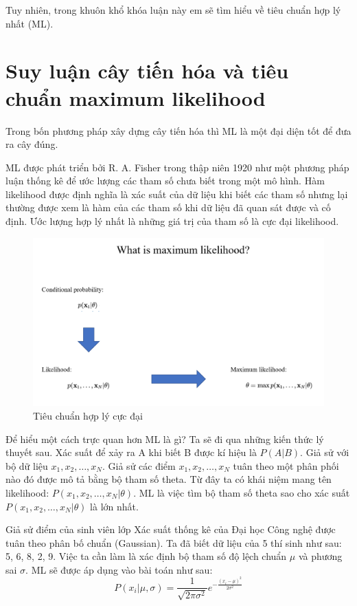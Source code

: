 \documentclass[12pt]{report}
\begin{document}
Tuy nhiên, trong khuôn khổ khóa luận này em sẽ tìm hiểu về tiêu chuẩn hợp lý nhất (ML).

\section{Suy luận cây tiến hóa và tiêu chuẩn maximum likelihood}
Trong bốn phương pháp xây dựng cây tiến hóa thì ML là một đại diện tốt để đưa ra cây đúng.

ML \cite{cia-13} được phát triển  bởi R. A. Fisher trong thập niên 1920 như một phương pháp luận thống kê để ước lượng các tham số chưa biết trong một mô hình. Hàm likelihood được định nghĩa là xác suất của dữ liệu khi biết các tham số nhưng lại thường được xem là hàm của các tham số khi dữ liệu đã quan sát được và cố định. Ước lượng hợp lý nhất là những giá trị của tham số là cực đại likelihood. 

\begin{figure}[h]
	\centering
	\includegraphics[scale=0.5]{Image/2.1.png}
	\caption{Tiêu chuẩn hợp lý cực đại}
	\label{fig:image2.1}
\end{figure}

Để hiểu một cách trực quan hơn ML là gì? Ta sẽ đi qua những kiến thức lý thuyết sau. Xác suất để xảy ra A khi biết B được kí hiệu là $P(A|B)$. Giả sử với bộ dữ liệu $ x_1, x_2, …, x_N $. Giả sử các điểm  $ x_1, x_2, …, x_N $ tuân theo một phân phối nào đó được mô tả bằng bộ tham số theta. Từ đây ta có khái niệm mang tên likelihood:  $ P(x_1, x_2, …, x_N | \theta) $. ML là việc tìm bộ tham số theta sao cho xác suất $ P(x_1, x_2, …, x_N | \theta) $ là lớn nhất. 

Giả sử điểm của sinh viên lớp Xác suất thống kê của Đại học Công nghệ được tuân theo phân bố chuẩn (Gaussian). Ta đã biết dữ liệu của 5 thí sinh như sau: 5, 6, 8, 2, 9. Việc ta cần làm là xác định bộ tham số độ lệch chuẩn $ \mu $ và phương sai $ \sigma $. ML sẽ được áp dụng vào bài toán như sau:
$$ P(x_i | \mu,\sigma) = \frac{1}{\sqrt{2\pi\sigma^2}} e ^ {-\frac{(x_i - \mu)^2}{2 \sigma^2}} $$
\end{document}
